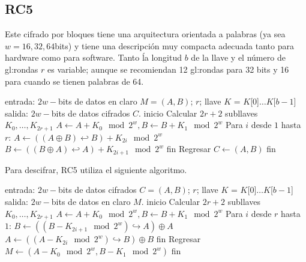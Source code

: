 \subsection{RC5}
Este cifrado por bloques tiene una arquitectura orientada a palabras (ya
sea $w = 16, 32, 64$bits) y tiene una descripción muy compacta adecuada
tanto para hardware como para software. Tanto ĺa longitud $b$ de la
llave y el número de \glspl{gl:ronda} $r$ es variable; aunque se recomiendan 12
\glspl{gl:ronda} para 32 bits y 16 para cuando se tienen palabras de 64.

\begin{pseudocodigo}[caption={RC5, cifrado.}, label={rc5:1}]
  entrada:  $2w-$bits de datos en claro $M = (A, B)$; $r$;
      llave $K$ = $K$[0]$\dots K$[$b-1$]
  salida:   $2w-$bits de datos cifrados $C$.
  inicio
    Calcular $2r + 2$ subllaves $K_0, \dots, K_{2r+1}$
    $A \leftarrow A + K_0 \mod2^w, B \leftarrow B + K_1 \mod2^w$
    Para $i$ desde $1$ hasta $r$:
      $A \leftarrow ((A \oplus B) \hookleftarrow B) + K_{2i} \mod2^w$
      $B \leftarrow ((B \oplus A) \hookleftarrow A) + K_{2i+1} \mod2^w$
    fin
    Regresar $C \leftarrow (A,B)$
  fin
\end{pseudocodigo}

Para descifrar, RC5 utiliza el siguiente algoritmo.
\begin{pseudocodigo}[caption={RC5, descifrado.}, label={rc5:2}]
  entrada:  $2w-$bits de datos cifrados $C = (A, B)$; $r$;
      llave $K$ = $K$[0]$\dots K$[$b-1$]
  salida:   $2w-$bits de datos en claro $M$.
  inicio
    Calcular $2r + 2$ subllaves $K_0, \dots, K_{2r+1}$
    $A \leftarrow A + K_0 \mod2^w, B \leftarrow B + K_1 \mod2^w$
    Para $i$ desde $r$ hasta $1$:
      $B \leftarrow ((B - K_{2i+1} \mod2^w) \hookrightarrow A) \oplus A$
      $A \leftarrow ((A - K_{2i} \mod2^w) \hookrightarrow B) \oplus B$
    fin
    Regresar $M \leftarrow (A-K_0 \mod2^w, B-K_1 \mod2^w)$
  fin
\end{pseudocodigo}
